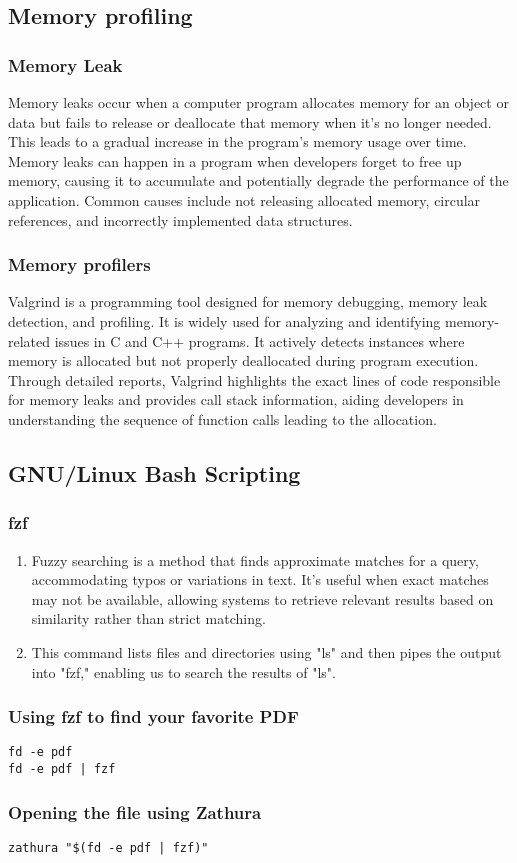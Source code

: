 \documentclass[titlepage]{article}
\begin{document}
\subsection{Memory profiling}
\subsubsection{Memory Leak}
Memory leaks occur when a computer program allocates memory for an object or data but fails to release or deallocate that memory when it's no longer needed. This leads to a gradual increase in the program's memory usage over time. Memory leaks can happen in a program when developers forget to free up memory, causing it to accumulate and potentially degrade the performance of the application. Common causes include not releasing allocated memory, circular references, and incorrectly implemented data structures.
\subsubsection{Memory profilers}
Valgrind is a programming tool designed for memory debugging, memory leak detection, and profiling. It is widely used for analyzing and identifying memory-related issues in C and C++ programs. It actively detects instances where memory is allocated but not properly deallocated during program execution. Through detailed reports, Valgrind highlights the exact lines of code responsible for memory leaks and provides call stack information, aiding developers in understanding the sequence of function calls leading to the allocation.
\subsection{GNU/Linux Bash Scripting}
\subsubsection{fzf}
\begin{enumerate}
    \item Fuzzy searching is a method that finds approximate matches for a query, accommodating typos or variations in text. It's useful when exact matches may not be available, allowing systems to retrieve relevant results based on similarity rather than strict matching.

    \item This command lists files and directories using "ls" and then pipes the output into "fzf," enabling us to search the results of "ls".
\end{enumerate}
\subsubsection{Using fzf to find your favorite PDF}
\begin{verbatim}
fd -e pdf
fd -e pdf | fzf
\end{verbatim}
\subsubsection{Opening the file using Zathura}
\begin{verbatim}
zathura "$(fd -e pdf | fzf)"
\end{verbatim}
\end{document}
